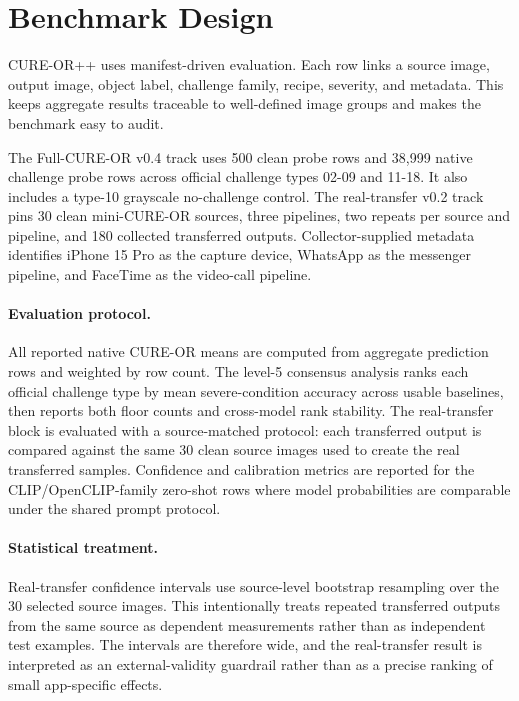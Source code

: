 \documentclass[10pt]{article}
\begin{document}
\section{Benchmark Design}

CURE-OR++ uses manifest-driven evaluation. Each row links a source image, output image, object label, challenge family, recipe, severity, and metadata. This keeps aggregate results traceable to well-defined image groups and makes the benchmark easy to audit.

The Full-CURE-OR v0.4 track uses 500 clean probe rows and 38,999 native challenge probe rows across official challenge types 02-09 and 11-18. It also includes a type-10 grayscale no-challenge control. The real-transfer v0.2 track pins 30 clean mini-CURE-OR sources, three pipelines, two repeats per source and pipeline, and 180 collected transferred outputs. Collector-supplied metadata identifies iPhone 15 Pro as the capture device, WhatsApp as the messenger pipeline, and FaceTime as the video-call pipeline.

\paragraph{Evaluation protocol.}
All reported native CURE-OR means are computed from aggregate prediction rows and weighted by row count. The level-5 consensus analysis ranks each official challenge type by mean severe-condition accuracy across usable baselines, then reports both floor counts and cross-model rank stability. The real-transfer block is evaluated with a source-matched protocol: each transferred output is compared against the same 30 clean source images used to create the real transferred samples. Confidence and calibration metrics are reported for the CLIP/OpenCLIP-family zero-shot rows where model probabilities are comparable under the shared prompt protocol.

\paragraph{Statistical treatment.}
Real-transfer confidence intervals use source-level bootstrap resampling over the 30 selected source images. This intentionally treats repeated transferred outputs from the same source as dependent measurements rather than as independent test examples. The intervals are therefore wide, and the real-transfer result is interpreted as an external-validity guardrail rather than as a precise ranking of small app-specific effects.
\end{document}
